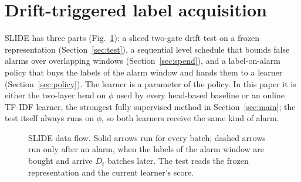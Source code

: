 \section{Drift-triggered label acquisition}\label{sec:method}

SLIDE has three parts (Fig.~\ref{fig:arch}): a sliced two-gate drift test on a frozen representation (Section~\ref{sec:test}), a sequential level schedule that bounds false alarms over overlapping windows (Section~\ref{sec:spend}), and a label-on-alarm policy that buys the labels of the alarm window and hands them to a learner (Section~\ref{sec:policy}). The learner is a parameter of the policy. In this paper it is either the two-layer head on $\phi$ used by every head-based baseline or an online TF-IDF learner, the strongest fully supervised method in Section~\ref{sec:main}; the test itself always runs on $\phi$, so both learners receive the same kind of alarm.

\begin{figure}[t]
\centering
{}
\caption{SLIDE data flow. Solid arrows run for every batch; dashed arrows run only after an alarm, when the labels of the alarm window are bought and arrive $D_t$ batches later. The test reads the frozen representation and the current learner's score.}
\label{fig:arch}
\end{figure}

